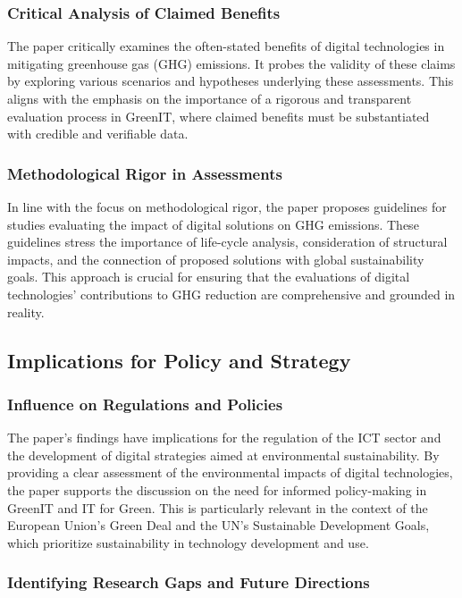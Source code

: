 \documentclass[conference,compsoc]{IEEEtran}
\begin{document}
\subsubsection{Critical Analysis of Claimed Benefits}

The paper critically examines the often-stated benefits of digital technologies in mitigating greenhouse gas (GHG) emissions. It probes the validity of these claims by exploring various scenarios and hypotheses underlying these assessments. This aligns with the  emphasis on the importance of a rigorous and transparent evaluation process in GreenIT, where claimed benefits must be substantiated with credible and verifiable data.

\subsubsection{Methodological Rigor in Assessments}

In line with the  focus on methodological rigor, the paper proposes guidelines for studies evaluating the impact of digital solutions on GHG emissions. These guidelines stress the importance of life-cycle analysis, consideration of structural impacts, and the connection of proposed solutions with global sustainability goals. This approach is crucial for ensuring that the evaluations of digital technologies' contributions to GHG reduction are comprehensive and grounded in reality.

\subsection{Implications for Policy and Strategy}

\subsubsection{Influence on Regulations and Policies}

The paper's findings have implications for the regulation of the ICT sector and the development of digital strategies aimed at environmental sustainability. By providing a clear assessment of the environmental impacts of digital technologies, the paper supports the  discussion on the need for informed policy-making in GreenIT and IT for Green. This is particularly relevant in the context of the European Union's Green Deal and the UN's Sustainable Development Goals, which prioritize sustainability in technology development and use.

\subsubsection{Identifying Research Gaps and Future Directions}
\end{document}
